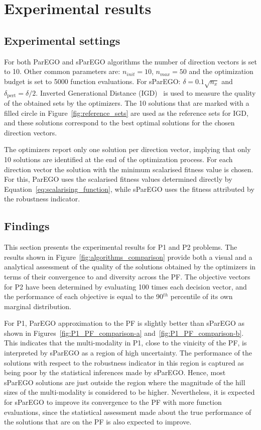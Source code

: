 \documentclass{llncs}
\begin{document}
\section{Experimental results}\label{sec:results}

\subsection{Experimental settings}

For both ParEGO and sParEGO algorithms the number of direction vectors is set to 10. Other common parameters are: $n_{init} = 10$, $n_{max} = 50$ and the optimization budget is set to 5000 function evaluations. For sParEGO: $\delta=0.1 \sqrt{n_x}$ and $\delta_{\text{pert}}=\delta / 2$. Inverted Generational Distance (IGD)~\cite{bib:generational_distance} is used to measure the quality of the obtained sets by the optimizers. The 10 solutions that are marked with a filled circle in Figure~\ref{fig:reference_sets} are used as the reference sets for IGD, and these solutions correspond to the best optimal solutions for the chosen direction vectors. 

The optimizers report only one solution per direction vector, implying that only 10 solutions are identified at the end of the optimization process. For each direction vector the solution with the minimum scalarised fitness value is chosen. For this, ParEGO uses the scalarised fitness values determined directly by Equation~\ref{eq:scalarising_function}, while sParEGO uses the fitness attributed by the robustness indicator.

\subsection{Findings}

This section presents the experimental results for P1 and P2 problems. The results shown in Figure~\ref{fig:algorithms_comparison} provide both a visual and a analytical assessment of the quality of the solutions obtained by the optimizers in terms of their convergence to and diversity across the PF. The objective vectors for P2 have been determined by evaluating 100 times each decision vector, and the performance of each objective is equal to the 90$^{th}$ percentile of its own marginal distribution.

For P1, ParEGO approximation to the PF is slightly better than sParEGO as shown in Figures~\ref{fig:P1_PF_comparison-a} and~\ref{fig:P1_PF_comparison-b}. This indicates that the multi-modality in P1, close to the vinicity of the PF, is interpreted by sParEGO as a region of high uncertainty. The performance of the solutions with respect to the robustness indicator in this region is captured as being poor by the statistical inferences made by sParEGO. Hence, most sParEGO solutions are just outside the region where the magnitude of the hill sizes of the multi-modality is considered to be higher. Nevertheless, it is expected for sParEGO to improve its convergence to the PF with more function evaluations, since the statistical assessment made about the true performance of the solutions that are on the PF is also expected to improve.
\end{document}
